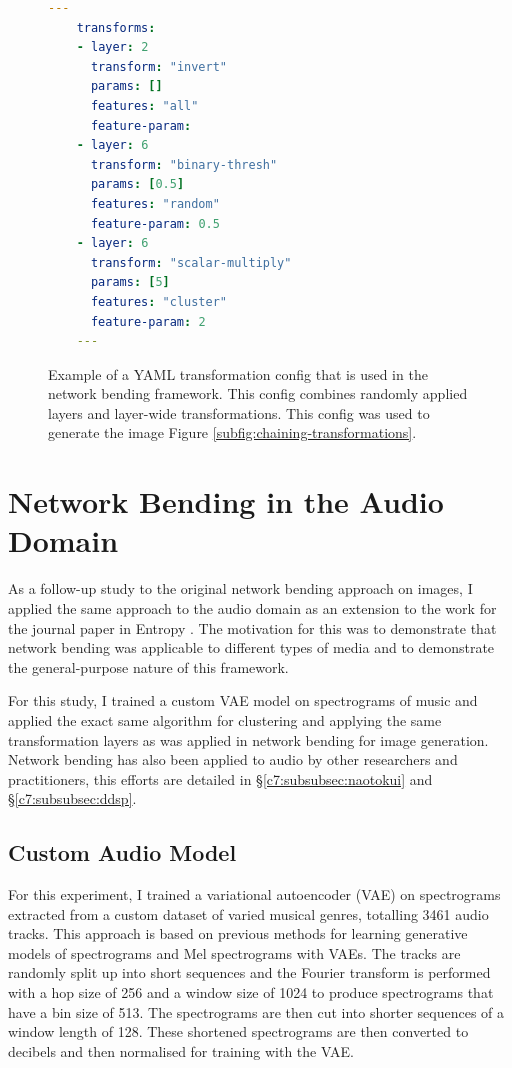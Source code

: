 \begin{figure}[!htb]
 \begin{lstlisting}[language=yaml]
    ---
    transforms:
    - layer: 2
      transform: "invert"
      params: []
      features: "all"
      feature-param: 
    - layer: 6
      transform: "binary-thresh"
      params: [0.5]
      features: "random"
      feature-param: 0.5
    - layer: 6
      transform: "scalar-multiply"
      params: [5]
      features: "cluster"
      feature-param: 2
    ---
    \end{lstlisting}
    \caption[Example YAML transformation config]{Example of a YAML transformation config that is used in the network bending framework. This config combines randomly applied layers and layer-wide transformations. This config was used to generate the image Figure \ref{subfig:chaining-transformations}.}
    \label{fig:c5:yaml-transform-config}
 \end{figure}

\section{Network Bending in the Audio Domain}
\label{c5:sec:net-bend-audio}

As a follow-up study to the original network bending approach on images, I applied the same approach to the audio domain as an extension to the work for the journal paper in Entropy \citep{broad2022network}. 
The motivation for this was to demonstrate that network bending was applicable to different types of media and to demonstrate the general-purpose nature of this framework. 

For this study, I trained a custom VAE model on spectrograms of music and applied the exact same algorithm for clustering and applying the same transformation layers as was applied in network bending for image generation. 
Network bending has also been applied to audio by other researchers and practitioners, this efforts are detailed in \S \ref{c7:subsubsec:naotokui} and \S \ref{c7:subsubsec:ddsp}.

\subsection{Custom Audio Model}

For this experiment, I trained a variational autoencoder (VAE) \citep{kingma2013auto,rezende2014stochastic} on spectrograms extracted from a custom dataset of varied musical genres, totalling 3461 audio tracks. This approach is based on previous methods for learning generative models of spectrograms \citep{akten2018granma} and Mel spectrograms \citep{valenzuela2021melspecvae} with VAEs. The tracks are randomly split up into short sequences and the Fourier transform is performed with a hop size of 256 and a window size of 1024 to produce spectrograms that have a bin size of 513. The spectrograms are then cut into shorter sequences of a window length of 128. These shortened spectrograms are then converted to decibels and then normalised for training with the VAE.  


